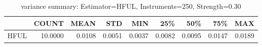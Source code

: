 \begin{table}[ht]
\centering
\caption{variance summary: Estimator=HFUL, Instruments=250, Strength=0.30}
\begin{tabular}{lrrrrrrrr}
\toprule
 & COUNT & MEAN & STD & MIN & 25\% & 50\% & 75\% & MAX \\
\midrule
HFUL & 10.0000 & 0.0108 & 0.0051 & 0.0037 & 0.0082 & 0.0095 & 0.0147 & 0.0189 \\
\bottomrule
\end{tabular}
\end{table}
